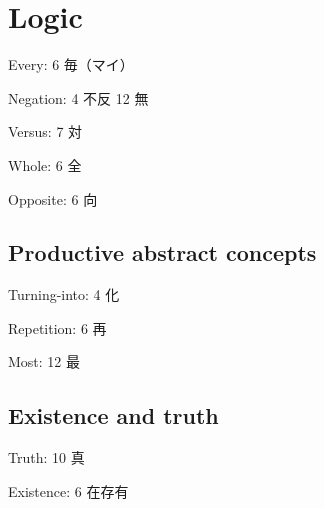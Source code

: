 \chapter{Logic}

Every: 6 毎（マイ）

Negation: 4 不反 12 無

Versus: 7 対

Whole: 6 全

Opposite: 6 向

\section{Productive abstract concepts}

Turning-into: 4 化

Repetition: 6 再

Most: 12 最

\section{Existence and truth}

Truth: 10 真

Existence: 6 在存有
